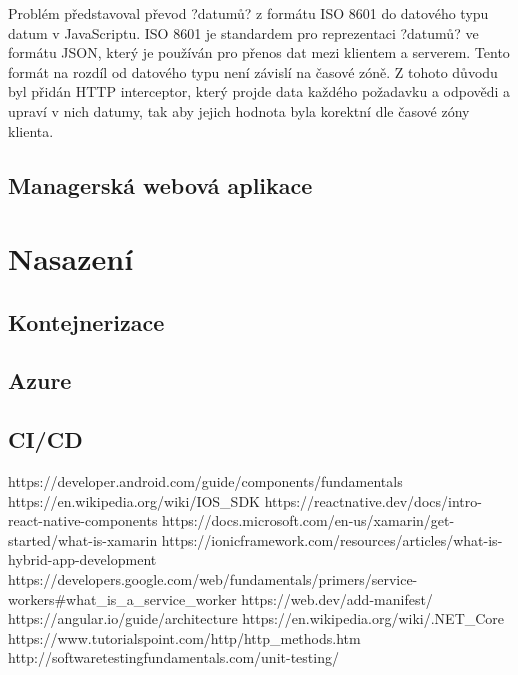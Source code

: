 \documentclass[
  biblatex,
  glossaries,
  index
]{kidiplom}
\begin{document}
Problém představoval převod ?datumů? z formátu ISO 8601 do datového typu datum v JavaScriptu. ISO 8601 je standardem pro reprezentaci ?datumů? ve formátu JSON, který je používán pro přenos dat mezi klientem a serverem. Tento formát na rozdíl od datového typu není závislí na časové zóně. Z tohoto důvodu byl přidán HTTP interceptor, který projde data každého požadavku a odpovědi a upraví v nich datumy, tak aby jejich hodnota byla korektní dle časové zóny klienta.



\subsection{Managerská webová aplikace}

\newpage

\section{Nasazení}

\subsection{Kontejnerizace}

\subsection{Azure}

\subsection{CI/CD}

\newpage


\begin{thebibliography}{9}
  https://developer.android.com/guide/components/fundamentals
  https://en.wikipedia.org/wiki/IOS_SDK
  https://reactnative.dev/docs/intro-react-native-components
  https://docs.microsoft.com/en-us/xamarin/get-started/what-is-xamarin
  https://ionicframework.com/resources/articles/what-is-hybrid-app-development
  https://developers.google.com/web/fundamentals/primers/service-workers#what_is_a_service_worker 
   https://web.dev/add-manifest/
  https://angular.io/guide/architecture
   https://en.wikipedia.org/wiki/.NET_Core
   https://www.tutorialspoint.com/http/http_methods.htm
   http://softwaretestingfundamentals.com/unit-testing/
 \end{thebibliography}
\end{document}

